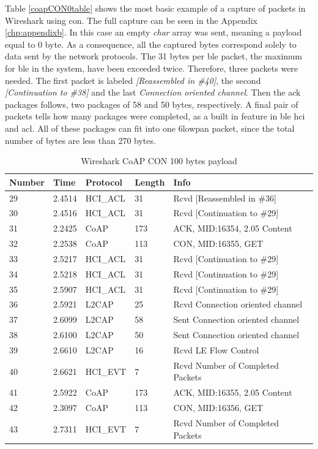 \noindent Table \ref{coapCON0table} shows the most basic example of a capture of packets in Wireshark using \gls{con}. The full capture can be seen in the Appendix \ref{chp:appendixb}. In this case an empty \textit{char} array was sent, meaning a \gls{payload} equal to 0 byte. As a consequence, all the captured bytes correspond solely to data sent by the network protocols. The 31 bytes per \gls{ble} packet, the maximum for \gls{ble} in the system, have been exceeded twice. Therefore, three packets were needed. The first packet is labeled \textit{[Reassembled in \#40]}, the second \textit{[Continuation to \#38]} and the last \textit{Connection oriented channel}. Then the \gls{ack} packages follows, two packages of 58 and 50 bytes, respectively. A final pair of packets tells how many packages were completed, as a built in feature in \gls{ble}  \gls{hci}  and \gls{acl}. All of these packages can fit into one \gls{6lowpan} packet, since the total number of bytes are less than 270 bytes. 




\begin{table}[H]
\centering
\caption{Wireshark CoAP CON 100 bytes payload}
\label{coapCON100table}
\begin{tabular}{lllll}
Number & Time   & Protocol & Length & Info                             \\ \hline
29     & 2.4514 & HCI\_ACL & 31     & Rcvd {[}Reassembled in \#36{]}   \\
30     & 2.4516 & HCI\_ACL & 31     & Rcvd {[}Continuation to \#29{]}  \\
31     & 2.2425 & CoAP     & 173    & ACK, MID:16354, 2.05 Content     \\
32     & 2.2538 & CoAP     & 113    & CON, MID:16355, GET              \\
33     & 2.5217 & HCI\_ACL & 31     & Rcvd {[}Continuation to \#29{]}  \\
34     & 2.5218 & HCI\_ACL & 31     & Rcvd {[}Continuation to \#29{]}  \\
35     & 2.5907 & HCI\_ACL & 31     & Rcvd {[}Continuation to \#29{]}  \\
36     & 2.5921 & L2CAP    & 25     & Rcvd Connection oriented channel \\
37     & 2.6099 & L2CAP    & 58     & Sent Connection oriented channel \\
38     & 2.6100 & L2CAP    & 50     & Sent Connection oriented channel \\
39     & 2.6610 & L2CAP    & 16     & Rcvd LE Flow Control             \\
40     & 2.6621 & HCI\_EVT & 7      & Rcvd Number of Completed Packets \\
41     & 2.5922 & CoAP     & 173    & ACK, MID:16355, 2.05 Content     \\
42     & 2.3097 & CoAP     & 113    & CON, MID:16356, GET              \\ 
43     & 2.7311 & HCI\_EVT & 7      & Rcvd Number of Completed Packets \\ \hline
\end{tabular}
\end{table}

